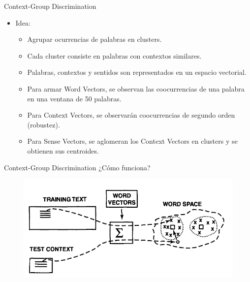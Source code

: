 \documentclass[xcolor=x11names,compress]{beamer}
\renewcommand{\(}{\begin{columns}}
\renewcommand{\)}{\end{columns}}
\newcommand{\<}[1]{\begin{column}{#1}}
\renewcommand{\>}{\end{column}}
\begin{document}
\begin{frame}{Context-Group Discrimination}
\begin{itemize}
\item Idea:
\begin{itemize}
\item Agrupar ocurrencias de palabras en clusters.
\item Cada cluster consiste en palabras con contextos similares.
\item Palabras, contextos y sentidos son representados en un espacio vectorial.
\item Para armar Word Vectors, se observan las coocurrencias de una palabra en una ventana de 50 palabras.
\item Para Context Vectors, se observarán coocurrencias de segundo orden (robustez).
\item Para Sense Vectors, se aglomeran los Context Vectors en clusters y se obtienen sus centroides.
\end{itemize}
\end{itemize}
\end{frame}


\begin{frame}{Context-Group Discrimination}
¿Cómo funciona?
\begin{figure}
\centering
\includegraphics[scale=0.5, keepaspectratio=True, natwidth=800,natheight=600]{basig_design.png}
\end{figure}
\end{frame}

\end{document}
